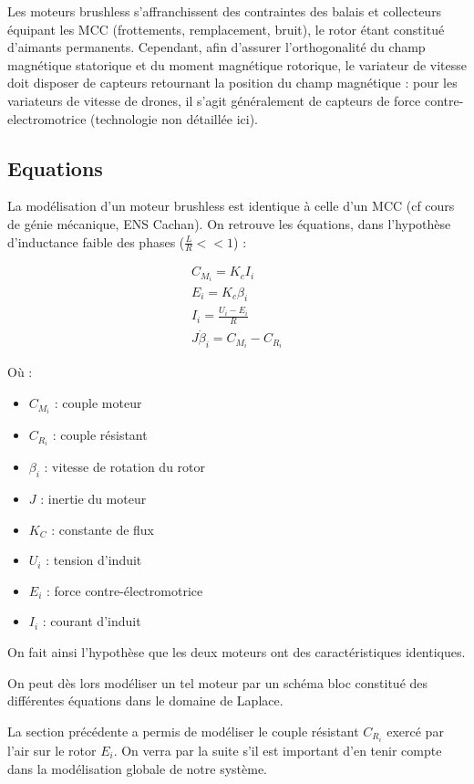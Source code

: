 \documentclass[10pt,a4paper]{article}
\begin{document}
Les moteurs brushless s'affranchissent des contraintes des balais et collecteurs équipant les MCC (frottements, remplacement, bruit), le rotor étant constitué d'aimants permanents. Cependant, afin d'assurer l'orthogonalité du champ magnétique statorique et du moment magnétique rotorique, le variateur de vitesse doit disposer de capteurs retournant la position du champ magnétique : pour les variateurs de vitesse de drones, il s'agit généralement de capteurs de force contre-electromotrice (technologie non détaillée ici).

\subsection{Equations}

La modélisation d'un moteur brushless est identique à celle d'un MCC (cf cours de génie mécanique, ENS Cachan). On retrouve les équations, dans l'hypothèse d'inductance faible des phases ($\frac{L}{R} <<1$) :

\begin{eqnarray}
C_{M_{i}} = K_{c} I_{i} \\
E_{i} = K_{c} \beta_{i} \\
I_{i} = \frac{U_{i} - E_{i}}{R} \\
J \dot \beta_{i} = C_{M_{i}} - C_{R_{i}}
\end{eqnarray}

Où : 

\begin{itemize}
\item $C_{M_{i}}$ : couple moteur
\item $C_{R_{i}}$ : couple résistant
\item $\beta_{i}$ : vitesse de rotation du rotor
\item $J$ : inertie du moteur
\item $K_{C}$ : constante de flux
\item $U_{i}$ : tension d'induit
\item $E_{i}$ : force contre-électromotrice
\item $I_{i}$ : courant d'induit
\end{itemize} 

On fait ainsi l'hypothèse que les deux moteurs ont des caractéristiques identiques.

On peut dès lors modéliser un tel moteur par un schéma bloc constitué des différentes équations dans le domaine de Laplace.

La section précédente a permis de modéliser le couple résistant $C_{R_{i}}$ exercé par l'air sur le rotor $E_{i}$. On verra par la suite s'il est important d'en tenir compte dans la modélisation globale de notre système.
\end{document}
